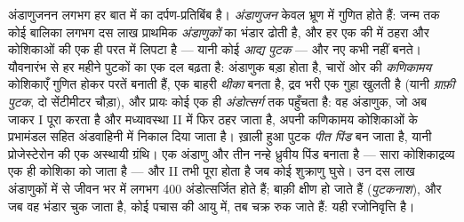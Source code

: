 \begin{definition}[अंडाशय और अंडाणुजनन]\label{def:b2:mammal-reproduction:ovary}
अंडाणुजनन लगभग हर बात में  का दर्पण-प्रतिबिंब
है। \emph{अंडाणुजन} केवल भ्रूण में गुणित होते हैं: जन्म तक कोई बालिका
लगभग दस लाख प्राथमिक \emph{अंडाणुकों} का भंडार ढोती है, और हर एक
 की  में ठहरा और कोशिकाओं की एक ही परत में
लिपटा है --- यानी कोई \emph{आद्य पुटक} --- और नए कभी नहीं
बनते। यौवनारंभ से हर महीने पुटकों का एक दल बढ़ता है:
अंडाणुक बड़ा होता है, चारों ओर की \emph{कणिकामय} कोशिकाएँ गुणित होकर
परतें बनाती हैं, एक बाहरी \emph{थीका} बनता है, द्रव भरी एक गुहा
खुलती है (यानी \emph{ग्राफ़ी पुटक}, दो सेंटीमीटर चौड़ा), और
प्रायः कोई एक ही \emph{अंडोत्सर्ग} तक पहुँचता है: वह अंडाणुक, जो अब जाकर
 I पूरा करता है और मध्यावस्था II में फिर ठहर जाता है,
अपनी कणिकामय कोशिकाओं के प्रभामंडल सहित अंडवाहिनी में निकाल दिया जाता
है। ख़ाली हुआ पुटक \emph{पीत पिंड} बन जाता है, यानी
प्रोजेस्टेरोन की एक अस्थायी ग्रंथि।  एक अंडाणु और तीन
नन्हे ध्रुवीय पिंड बनाता है --- सारा कोशिकाद्रव्य एक ही कोशिका को जाता
है --- और  II तभी पूरा होता है जब कोई शुक्राणु
घुसे। उन दस लाख अंडाणुकों में से जीवन भर में लगभग \num{400} अंडोत्सर्जित
होते हैं; बाक़ी क्षीण हो जाते हैं
(\emph{पुटकनाश}), और जब वह भंडार चुक जाता है, कोई पचास की आयु में, तब
चक्र रुक जाते हैं: यही रजोनिवृत्ति है।
\end{definition}

